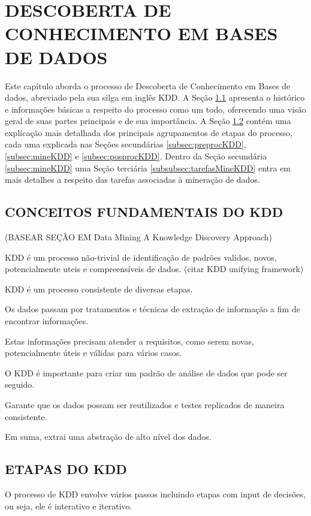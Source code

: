 
%

\chapter{DESCOBERTA DE CONHECIMENTO EM BASES DE DADOS}
\label{chap:descobertaConhecimento}
Este capítulo aborda o processo de Descoberta de Conhecimento em Bases de dados, abreviado pela sua silga em inglês KDD. A Seção \ref{sec:conceitosKDD} apresenta o histórico e informações básicas a respeito do processo como um todo, oferecendo uma visão geral de suas partes principais e de sua importância. A Seção \ref{sec:etapasKDD} contém uma explicação mais detalhada dos principais agrupamentos de etapas do processo, cada uma explicada nas Seções secundárias \ref{subsec:preprocKDD}, \ref{subsec:mineKDD} e \ref{subsec:posprocKDD}. Dentro da Seção secundária \ref{subsec:mineKDD} uma Seção terciária \ref{subsubsec:tarefasMineKDD} entra em mais detalhes a respeito das tarefas associadas à mineração de dados.

\section{CONCEITOS FUNDAMENTAIS DO KDD}
\label{sec:conceitosKDD}

(BASEAR SEÇÃO EM Data Mining A Knowledge Discovery Approach)

KDD é um processo não-trivial de identificação de padrões validos, novos, potencialmente uteis e compreensíveis de dados. (citar KDD unifying framework)

KDD é um processo consistente de diversas etapas.

Os dados passam por tratamentos e técnicas de extração de informação a fim de encontrar informações.

Estas informações precisam atender a requisitos, como serem novas, potencialmente úteis e válidas para vários casos.

O KDD é importante para criar um padrão de análise de dados que pode ser seguido.

Garante que os dados possam ser reutilizados e testes replicados de maneira consistente.

Em suma, extrai uma abstração de alto nível dos dados.

\section{ETAPAS DO KDD}
\label{sec:etapasKDD}
O processo de KDD envolve vários passos incluindo etapas com input de decisões, ou seja, ele é interativo e iterativo.

